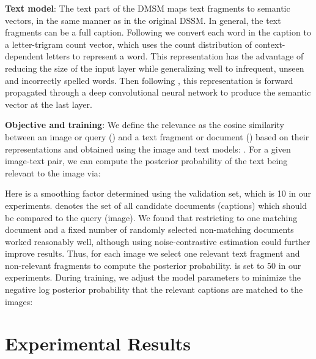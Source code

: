 \documentclass[10pt,twocolumn,letterpaper]{article}
\begin{document}
\textbf{Text model}: The text part of the DMSM maps text fragments to semantic vectors, in the same manner as in the original DSSM. In general, the text fragments can be a full caption. Following \cite{huang2013} we convert each word in the caption to a letter-trigram count vector, which uses the count distribution of context-dependent letters to represent a word. This representation has the advantage of reducing the size of the input layer while generalizing well to infrequent, unseen and incorrectly spelled words. Then following \cite{Shen2014}, this representation is forward propagated through a deep convolutional neural network to produce the semantic vector at the last layer.

\textbf{Objective and training}: We define the relevance  as the cosine similarity between an image or query () and a text fragment or document () based on their representations  and  obtained using the image and text models:
{\small }.
For a given image-text pair, we can compute the posterior probability of the text being relevant to the image via:\vspace{-.5em}

{\small}\vspace{-.5em}

Here  is a smoothing factor determined using the validation set, which is 10 in our experiments.  denotes the set of all candidate documents (captions) which should be compared to the query (image). We found that restricting  to one matching document  and a fixed number  of randomly selected non-matching documents  worked reasonably well, although using noise-contrastive estimation could further improve results. Thus, for each image we select one relevant text fragment and  non-relevant fragments to compute the posterior probability.  is set to 50 in our experiments. During training, we adjust the model parameters  to minimize the negative log posterior probability that the relevant captions are matched to the images:\vspace{-.5em}

{\small}\vspace{-.75em}

\section{Experimental Results}\label{sec:experiments}
\end{document}

